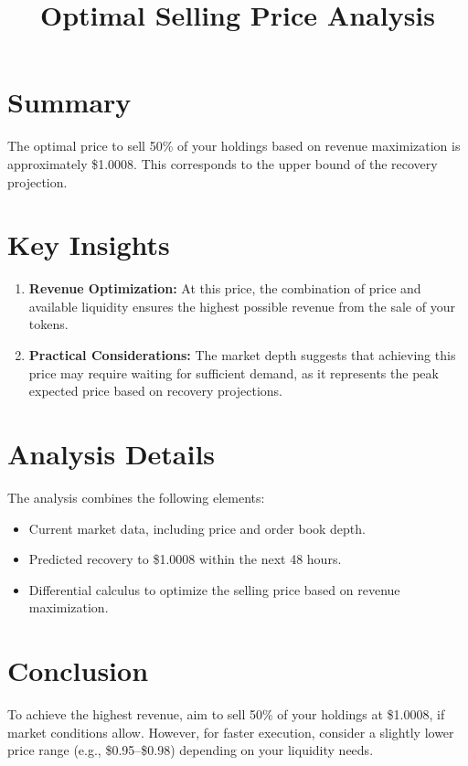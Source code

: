 \documentclass[12pt]{article}
\title{Optimal Selling Price Analysis}
\author{}
\date{}
\begin{document}
\maketitle

\section*{Summary}
The optimal price to sell 50\% of your holdings based on revenue maximization is approximately \$1.0008. This corresponds to the upper bound of the recovery projection.

\section*{Key Insights}
\begin{enumerate}
    \item \textbf{Revenue Optimization:} At this price, the combination of price and available liquidity ensures the highest possible revenue from the sale of your tokens.
    \item \textbf{Practical Considerations:} The market depth suggests that achieving this price may require waiting for sufficient demand, as it represents the peak expected price based on recovery projections.
\end{enumerate}

\section*{Analysis Details}
The analysis combines the following elements:
\begin{itemize}
    \item Current market data, including price and order book depth.
    \item Predicted recovery to \$1.0008 within the next 48 hours.
    \item Differential calculus to optimize the selling price based on revenue maximization.
\end{itemize}

\section*{Conclusion}
To achieve the highest revenue, aim to sell 50\% of your holdings at \$1.0008, if market conditions allow. However, for faster execution, consider a slightly lower price range (e.g., \$0.95–\$0.98) depending on your liquidity needs.
\end{document}
